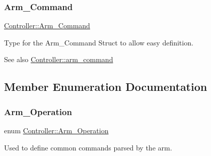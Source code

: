 \subsubsection{\texorpdfstring{Arm\+\_\+\+Command}{Arm\_Command}}
{\footnotesize\ttfamily \hyperlink{class_controller_ac48cc99091f83f149fef8f17fd5d7e7f}{Controller\+::\+Arm\+\_\+\+Command}}



Type for the Arm\+\_\+\+Command Struct to allow easy definition. 

\begin{DoxySeeAlso}{See also}
\hyperlink{struct_controller_1_1arm__command}{Controller\+::arm\+\_\+command} 
\end{DoxySeeAlso}


\subsection{Member Enumeration Documentation}
\mbox{\label{class_controller_a91a5751dd6920daf3b70814171b51767}} 
\subsubsection{\texorpdfstring{Arm\+\_\+\+Operation}{Arm\_Operation}}
{\footnotesize\ttfamily enum \hyperlink{class_controller_a91a5751dd6920daf3b70814171b51767}{Controller\+::\+Arm\+\_\+\+Operation}}



Used to define common commands parsed by the arm. 


